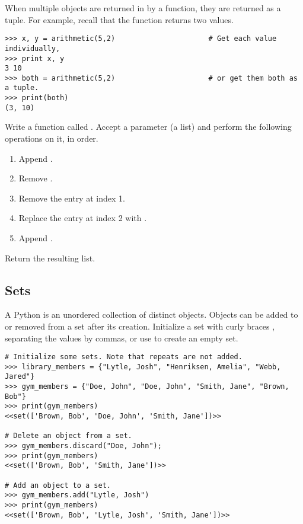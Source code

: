 When multiple objects are returned in by a function, they are returned as a tuple.
For example, recall that the  function returns two values.

\begin{lstlisting}
>>> x, y = arithmetic(5,2)                      # Get each value individually,
>>> print x, y
3 10
>>> both = arithmetic(5,2)                      # or get them both as a tuple.
>>> print(both)
(3, 10)
\end{lstlisting}

\begin{problem}
Write a function called .
Accept a parameter (a list) and perform the following operations on it, in order.
\begin{enumerate}
\item Append .
\item Remove .
\item Remove the entry at index 1.
\item Replace the entry at index 2 with .
\item Append .
\end{enumerate}
Return the resulting list.
\end{problem}


\subsection*{Sets}
A Python  is an unordered collection of distinct objects.
Objects can be added to or removed from a set after its creation.
Initialize a set with curly braces \li{\{ \}}, separating the values by commas, or use  to create an empty set.
\begin{lstlisting}
# Initialize some sets. Note that repeats are not added.
>>> library_members = {"Lytle, Josh", "Henriksen, Amelia", "Webb, Jared"}
>>> gym_members = {"Doe, John", "Doe, John", "Smith, Jane", "Brown, Bob"}
>>> print(gym_members)
<<set(['Brown, Bob', 'Doe, John', 'Smith, Jane'])>>

# Delete an object from a set.
>>> gym_members.discard("Doe, John");
>>> print(gym_members)
<<set(['Brown, Bob', 'Smith, Jane'])>>

# Add an object to a set.
>>> gym_members.add("Lytle, Josh")
>>> print(gym_members)
<<set(['Brown, Bob', 'Lytle, Josh', 'Smith, Jane'])>>
\end{lstlisting}

